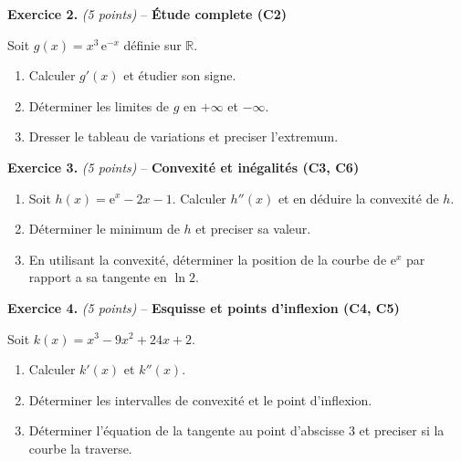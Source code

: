 \textbf{Exercice 2.} \textit{(5 points)} -- \textbf{Étude complete (C2)}

Soit $g(x) = x^3\,\mathrm{e}^{-x}$ définie sur $\mathbb{R}$.
\begin{enumerate}
  \item Calculer $g'(x)$ et étudier son signe.
  \item Déterminer les limites de $g$ en $+\infty$ et $-\infty$.
  \item Dresser le tableau de variations et preciser l'extremum.
\end{enumerate}

\bigskip

\textbf{Exercice 3.} \textit{(5 points)} -- \textbf{Convexité et inégalités (C3, C6)}

\begin{enumerate}
  \item Soit $h(x) = \mathrm{e}^x - 2x - 1$. Calculer $h''(x)$ et en déduire la convexité de $h$.
  \item Déterminer le minimum de $h$ et preciser sa valeur.
  \item En utilisant la convexité, déterminer la position de la courbe de $\mathrm{e}^x$ par rapport a sa tangente en $\ln 2$.
\end{enumerate}

\bigskip

\textbf{Exercice 4.} \textit{(5 points)} -- \textbf{Esquisse et points d'inflexion (C4, C5)}

Soit $k(x) = x^3 - 9x^2 + 24x + 2$.
\begin{enumerate}
  \item Calculer $k'(x)$ et $k''(x)$.
  \item Déterminer les intervalles de convexité et le point d'inflexion.
  \item Déterminer l'équation de la tangente au point d'abscisse $3$ et preciser si la courbe la traverse.
\end{enumerate}
